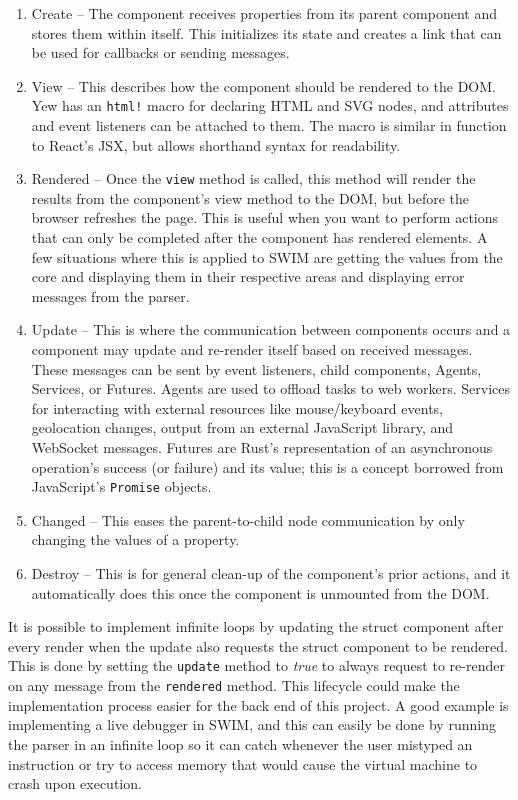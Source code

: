 \documentclass[
    paper=letter,
    parskip=half,
    fontsize=12pt,
    titlepage=firstiscover,
    toc=bibliography,
    numbers=endperiod
]{scrartcl}
\providecommand{\tightlist}{%
  \setlength{\itemsep}{0pt}\setlength{\parskip}{0pt}}
\begin{document}
\begin{enumerate}
    \tightlist
    \item Create -- The component receives properties from its parent component
          and stores them within itself. This initializes its state and creates a
          link that can be used for callbacks or sending messages.
    \item View -- This describes how the component should be rendered to the DOM.
          Yew has an \texttt{html!} macro for declaring HTML and SVG nodes, and
          attributes and event listeners can be attached to them. The macro is
          similar in function to React's JSX, but allows shorthand syntax for
          readability.
    \item Rendered -- Once the \texttt{view} method is called, this method will
          render the results from the component's view method to the DOM, but
          before the browser refreshes the page. This is useful when you want to
          perform actions that can only be completed after the component has
          rendered elements. A few situations where this is applied to SWIM are
          getting the values from the core and displaying them in their respective
          areas and displaying error messages from the parser.
    \item Update -- This is where the communication between components occurs and
          a component may update and re-render itself based on received messages.
          These messages can be sent by event listeners, child components, Agents,
          Services, or Futures. Agents are used to offload tasks to web workers.
          Services for interacting with external resources like mouse/keyboard
          events, geolocation changes, output from an external JavaScript library,
          and WebSocket messages. Futures are Rust's representation of an
          asynchronous operation's success (or failure) and its value; this is a
          concept borrowed from JavaScript's \texttt{Promise} objects.
    \item Changed -- This eases the parent-to-child node communication by only
          changing the values of a property.
    \item Destroy -- This is for general clean-up of the component's prior
          actions, and it automatically does this once the component is unmounted
          from the DOM.
\end{enumerate}

It is possible to implement infinite loops by updating the struct
component after every render when the update also requests the struct
component to be rendered. This is done by setting the \texttt{update}
method to {\em true} to always request to re-render on any message from
the \texttt{rendered} method. This lifecycle could make the
implementation process easier for the back end of this project. A good
example is implementing a live debugger in SWIM, and this can easily be
done by running the parser in an infinite loop so it can catch whenever
the user mistyped an instruction or try to access memory that would
cause the virtual machine to crash upon execution.
\end{document}
